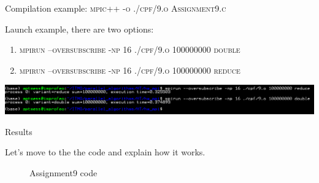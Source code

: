 \documentclass[%
12pt, %
final, %
oneside, %
onecolumn, %
centertags]{article} %
\theoremstyle{plain}
\theoremstyle{definition}
\theoremstyle{remark}
\begin{document}
Compilation example: \textsc{mpic++ -o ./cpf/9.o Assignment9.c}

Launch example, there are two options: 
\begin{enumerate}
	\item \textsc{mpirun --oversubscribe -np 16 ./cpf/9.o 100000000 double}
	\item \textsc{mpirun --oversubscribe -np 16 ./cpf/9.o 100000000 reduce}
\end{enumerate}

\begin{center}
\includegraphics[scale=0.48]{9.png}

Results
\end{center}

Let's move to the the code and explain how it works.

\begin{figure}[h!]
\centering
{} 

Assignment9 code
\end{figure}
\end{document}
